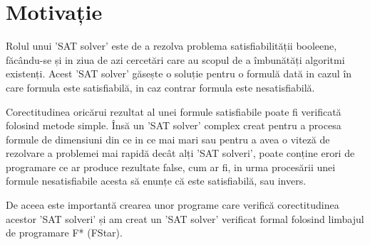 \chapter*{Motivație} 

Rolul unui 'SAT solver' este de a rezolva problema satisfiabilității booleene, \linebreak făcându-se și in ziua de azi cercetări care au scopul de a îmbunătăți algoritmi existenți. Acest 'SAT solver' găsește o soluție pentru o formulă dată in cazul în care formula este satisfiabilă, in caz contrar formula este nesatisfiabilă. 

Corectitudinea oricărui rezultat al unei formule satisfiabile poate fi verificată
\linebreak folosind metode simple. Însă un 'SAT solver' complex creat pentru a procesa \linebreak formule de dimensiuni din ce in ce mai mari sau pentru a avea o viteză de rezolvare a \linebreak problemei mai rapidă decât alți 'SAT solveri', poate conține erori de programare ce ar produce rezultate false, cum ar fi, in urma procesării unei formule nesatisfiabile acesta să enunțe că este satisfiabilă, sau invers.

De aceea este importantă crearea unor programe care verifică corectitudinea \linebreak acestor 'SAT solveri' și am creat un 'SAT solver' verificat formal folosind limbajul de programare F* (FStar).